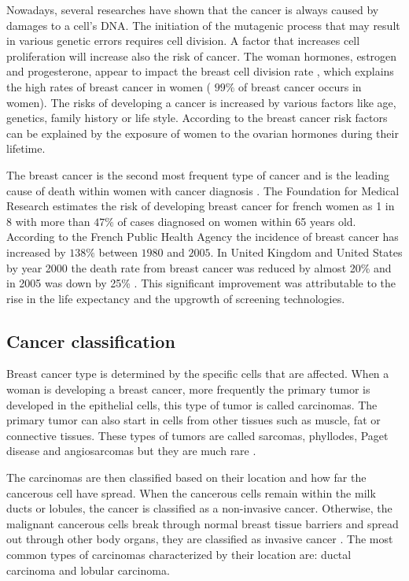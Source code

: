 Nowadays, several researches \citep{pike_estrogens_1993,martin_webmd_2017} have shown that the cancer is always caused by damages to a cell's DNA. The initiation of the mutagenic process that may result in various genetic errors requires cell division.  A factor that increases cell proliferation will increase also the risk of cancer. The woman hormones, estrogen and progesterone, appear to impact the breast cell division rate \citep{ciocca_estrogen_1997,fanelli_estrogen_1996},  which explains the high rates of breast cancer in women ( $99\%$ of breast cancer occurs in women). The risks of developing a cancer is increased by various factors like age, genetics, family history or life style. According to \citep{martin_webmd_2017} the breast cancer risk factors can be explained by the exposure of women to the ovarian hormones during their lifetime.

The breast cancer is the second most frequent type of cancer and is the leading cause of death within women with cancer diagnosis \citep{spf_chiffres_2017}.  The Foundation for Medical Research \citep{frm_chiffres_2017} estimates the risk of developing breast cancer for french women as 1 in 8 with more than $47\%$ of cases diagnosed on women within 65 years old.
According to the French Public Health Agency \citep{spf_chiffres_2017} the incidence of breast cancer has increased by $138\% $ between $1980$ and $2005$. In United Kingdom and United States by year 2000 the death rate from breast cancer was reduced by almost 20\% and in 2005 was down by 25\% \citep{peto_uk_2000}. This significant improvement was attributable to the rise in the life expectancy and the upgrowth of screening technologies.


\subsection{Cancer classification }\label{subsection:breastcancerclasification}
Breast cancer type is determined by the specific cells that are affected. 
When a woman is developing a breast cancer, more frequently the primary tumor is developed in the epithelial cells, this type of tumor is called carcinomas. The primary tumor can also start in cells from other tissues such as muscle, fat or connective tissues. These types of tumors are called sarcomas, phyllodes, Paget disease and angiosarcomas but they are much rare \citep{acs_cancer_2017}. 

The carcinomas are then classified based on their location and how far the cancerous cell have spread. When the cancerous cells remain within the milk ducts or lobules, the cancer is classified as a non-invasive cancer. Otherwise, the malignant cancerous cells break through normal breast tissue barriers and spread out through other body organs, they are classified as invasive cancer \citep{andolina2011mammographic}. The most common types of carcinomas characterized by their location are: ductal carcinoma and lobular carcinoma. 

